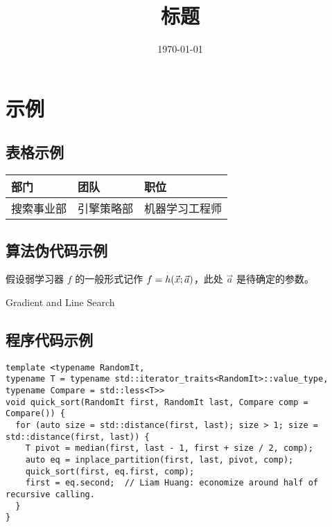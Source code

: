 \documentclass[UTF8, zihao = 5]{article}
\title{标题}
\author{\authorname}
\date{\today}
\begin{document}
\makefrontpage
{}  %

\section{示例}
\subsection{表格示例}

\begin{tabu} to \linewidth{X[1,c]X[2,c]X[1.5,c]}
\toprule
部门 & 团队 & 职位 \\
\midrule
搜索事业部 & 引擎策略部 & 机器学习工程师 \\
\bottomrule
\end{tabu}

\clp  %

\subsection{算法伪代码示例}

假设弱学习器 $f$ 的一般形式记作 $f = h(\vec{x}; \vec a)$，此处 $\vec a$ 是待确定的参数。

\begin{algorithm}[!htbp]
  \scriptsize
  \caption{Gradient and Line Search}\label{alg:GALS}
  \begin{algorithmic}[1]
      \EndFor
    \EndProcedure
  \end{algorithmic}
\end{algorithm}

\clp  %

\subsection{程序代码示例}

\begin{lstlisting}[style = lcpp, caption = {快速排序主函数}]
template <typename RandomIt,
typename T = typename std::iterator_traits<RandomIt>::value_type,
typename Compare = std::less<T>>
void quick_sort(RandomIt first, RandomIt last, Compare comp = Compare()) {
  for (auto size = std::distance(first, last); size > 1; size = std::distance(first, last)) {
    T pivot = median(first, last - 1, first + size / 2, comp);
    auto eq = inplace_partition(first, last, pivot, comp);
    quick_sort(first, eq.first, comp);
    first = eq.second;  // Liam Huang: economize around half of recursive calling.
  }
}
\end{lstlisting}
\end{document}
